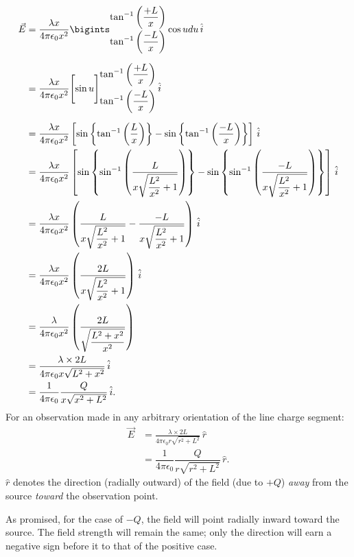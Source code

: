 \documentclass[12pt,b4paper]{article}
\begin{document}
\begin{align}
    \vec{E}&=\frac{\lambda x}{4\pi\epsilon_0x^2}\bigints_{\displaystyle\tan^{-1}\left(\frac{-L}{x}\right)}^{\displaystyle\tan^{-1}\left(\frac{+L}{x}\right)}\cos{u}{du}\,\hat{i}\notag\\[6pt]
    &=\frac{\lambda x}{4\pi\epsilon_0x^2}\Biggl[\sin{u}\Biggr]_{\displaystyle\tan^{-1}\left(\frac{-L}{x}\right)}^{\displaystyle\tan^{-1}\left(\frac{+L}{x}\right)}\,\hat{i}\notag\\[6pt]
    &=\frac{\lambda x}{4\pi\epsilon_0x^2}\left[\sin\left\{\tan^{-1}\left(\frac{L}{x}\right)\right\}-\sin\left\{\tan^{-1}\left(\frac{-L}{x}\right)\right\}\right]\,\hat{i}\notag\\
    &=\frac{\lambda x}{4\pi\epsilon_0x^2}\left[\sin\left\{\sin^{-1}\left(\frac{L}{\displaystyle x\sqrt{\frac{L^2}{x^2}+1}}\right)\right\}-\sin\left\{\sin^{-1}\left(\frac{-L}{\displaystyle x\sqrt{\frac{L^2}{x^2}+1}}\right)\right\}\right]\,\hat{i}\notag\\
    &=\frac{\lambda x}{4\pi\epsilon_0x^2}\left(\frac{L}{x\sqrt{\displaystyle\frac{L^2}{x^2}+1}}-\frac{-L}{\displaystyle x\sqrt{\frac{L^2}{x^2}+1}}\right)\,\hat{i}\notag\\
    &=\frac{\lambda x}{4\pi\epsilon_0x^2}\left(\frac{2L}{\displaystyle x\sqrt{\displaystyle\frac{L^2}{x^2}+1}}\right)\,\hat{i}\notag\\
    &=\frac{\lambda }{4\pi\epsilon_0x^2}\left(\frac{2L}{\displaystyle\sqrt{\frac{L^2+x^2}{x^2}}}\right)\notag\\
    &=\frac{\lambda\times2L}{4\pi\epsilon_0x\sqrt{L^2+x^2}}\,\hat{i}\\
    &=\dfrac{1}{4 \pi \epsilon_0} \dfrac{Q}{x\sqrt{x^2 + L^2}}\,\hat{i}.
\end{align}
For an observation made in any arbitrary orientation of the line charge segment:
\begin{align}
    \vec{E}&=\frac{\lambda\times2L}{4\pi\epsilon_0r\sqrt{r^2+L^2}}\,\hat{r}\\
    &=\dfrac{1}{4 \pi \epsilon_0} \dfrac{Q}{r\sqrt{r^2 + L^2}}\,\hat{r}.
\end{align}
$\hat{r}$ denotes the direction (radially outward) of the field (due to $+Q$) \textit{away} from the source \textit{toward} the observation point.

As promised, for the case of $-Q$, the field will point radially inward toward the source. The field strength will remain the same; only the direction will earn a negative sign before it to that of the positive case.
\end{document}
